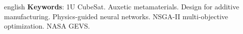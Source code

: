 \begin{resumo}[Abstract]
\begin{otherlanguage*}{english}
\vspace{\onelineskip}
\noindent
\textbf{Keywords}: 1U CubeSat. Auxetic metamaterials. Design for additive manufacturing. Physics-guided neural networks. NSGA-II multi-objective optimization. NASA GEVS.
\end{otherlanguage*}
\end{resumo}

